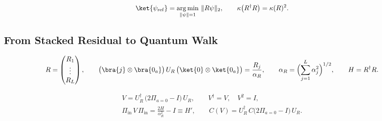 \begin{equation}
    \ket{\psi_{\mathrm{ref}}} = \operatorname*{arg\,min}_{\|\psi\| = 1}\,\|R\psi\|_2 ,
    \qquad
    \kappa\bigl(R^{\dagger}R\bigr) = \kappa(R)^2 .
    \label{eq:reference-svd}
\end{equation}

\subsection{From Stacked Residual to Quantum Walk}
\label{sec:pipeline-walk}

\begin{equation}
    R = \begin{pmatrix} R_1 \\ \vdots \\ R_L \end{pmatrix},
    \qquad
    \bigl(\bra{j}\otimes\bra{0_a}\bigr)\,U_R\,\bigl(\ket{0}\otimes\ket{0_a}\bigr) = \frac{R_j}{\alpha_R},
    \qquad
    \alpha_R = \Bigl(\sum_{j=1}^{L}\alpha_j^2\Bigr)^{1/2},
    \qquad
    H = R^{\dagger}R .
    \label{eq:stacked-encoding}
\end{equation}

\begin{proposition}
\label{prop:stacked-reflection}
\begin{equation}
    \begin{gathered}
        V = U_R^{\dagger}\,\bigl(2\Pi_{a=0} - I\bigr)\,U_R,
        \qquad
        V^{\dagger} = V, \quad V^2 = I, \\
        \Pi_{\mathrm{in}}\,V\,\Pi_{\mathrm{in}} = \frac{2H}{\alpha_R^2} - I \equiv H',
        \qquad
        C(V) = U_R^{\dagger}\,C\bigl(2\Pi_{a=0} - I\bigr)\,U_R .
    \end{gathered}
    \label{eq:stacked-reflection}
\end{equation}
\end{proposition}

